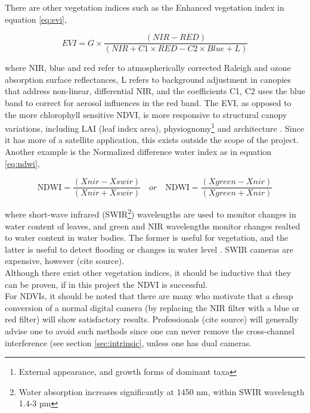 There are other vegetation indices such as the Enhanced vegetation index in equation \ref{eq:evi},

\begin{equation}\label{eq:evi}
EVI=G\times {\frac  {(NIR-RED)}{(NIR+C1\times RED-C2\times Blue+L)}}
\end{equation}

where NIR, blue and red refer to atmospherically corrected Raleigh and ozone absorption surface reflectances, L refers to background adjustment in canopies that address non-linear, differential NIR, and the coefficients C1, C2 uses the blue band to correct for aerosol influences in the red band. The EVI, as opposed to the more chlorophyll sensitive NDVI, is more responsive to structural canopy variations, including LAI (leaf index area), physiognomy\footnote{External appearance, and growth forms of dominant taxa} and architecture \cite{evi}. Since it has more of a satellite application, this exists outside the scope of the project.\\

Another example is the Normalized difference water index as in equation \ref{eq:ndwi},

\begin{equation}\label{eq:ndwi}
{\displaystyle {\mbox{NDWI}}={\frac {(Xnir-Xswir)}{(Xnir+Xswir)}}}\quad or\quad {\displaystyle {\mbox{NDWI}}={\frac {(Xgreen-Xnir)}{(Xgreen+Xnir)}}}
\end{equation}

where short-wave infrared (SWIR\footnote{Water absorption increases significantly at 1450 nm, within SWIR wavelength 1.4-3 µm}) wavelengths are used to monitor changes in water content of leaves, and green and NIR wavelengths monitor changes realted to water content in water bodies. The former is useful for vegetation, and the latter is useful to detect flooding or changes in water level \cite{ndwi}. SWIR cameras are expensive, however (cite source).\\

Although there exist other vegetation indices, it should be inductive that they can be proven, if in this project the NDVI is successful.\\

For NDVIs, it should be noted that there are many who motivate that a cheap conversion of a normal digital camera (by replacing the NIR filter with a blue or red filter) will show satisfactory results. Professionals (cite source) will generally advise one to avoid such methods since one can never remove the cross-channel interference (see section \ref{sec:intrinsic}, unless one has dual cameras.\\

